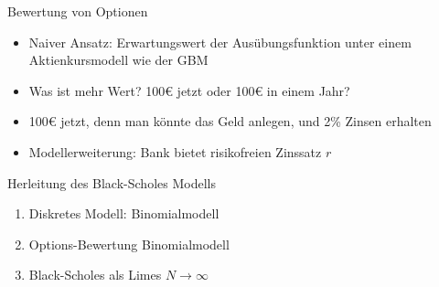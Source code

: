 \documentclass{beamer}
\begin{document}
\begin{frame}{Bewertung von Optionen}
  \begin{itemize}
      \item Naiver Ansatz: Erwartungswert der Ausübungsfunktion unter einem Aktienkursmodell wie der GBM
      \pause
      \item Was ist mehr Wert? 100€ jetzt oder 100€ in einem Jahr?
      \pause
      \item 100€ jetzt, denn man könnte das Geld anlegen, und 2\% Zinsen erhalten
      \item Modellerweiterung: Bank bietet risikofreien Zinssatz $r$
  \end{itemize}
\end{frame}

\begin{frame}{Herleitung des Black-Scholes Modells}
  \begin{enumerate}
      \item Diskretes Modell: Binomialmodell
      \item Options-Bewertung Binomialmodell
      \item Black-Scholes als Limes $N \to \infty$
  \end{enumerate}
\end{frame}
\end{document}
